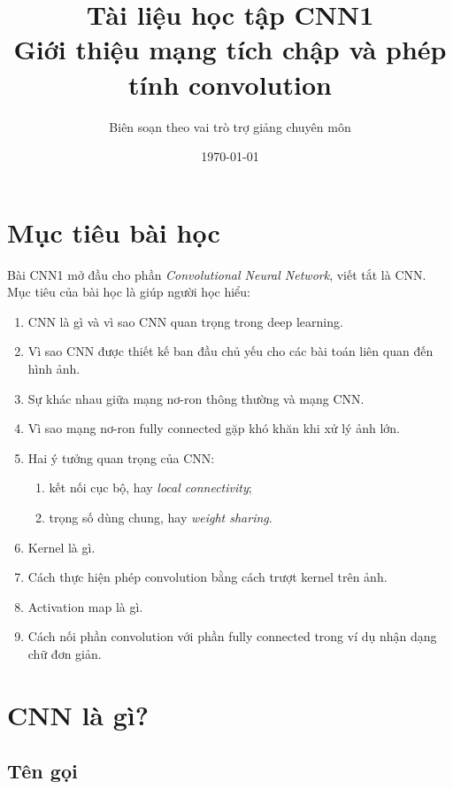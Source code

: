 \documentclass[12pt,a4paper]{report}
\title{
    \textbf{Tài liệu học tập CNN1}\\
    \large Giới thiệu mạng tích chập và phép tính convolution
}
\author{Biên soạn theo vai trò trợ giảng chuyên môn}
\date{\today}
\begin{document}
\maketitle
\tableofcontents
\newpage

\chapter*{Mục tiêu bài học}

Bài CNN1 mở đầu cho phần \textit{Convolutional Neural Network}, viết tắt là CNN. Mục tiêu của bài học là giúp người học hiểu:

\begin{enumerate}[label=\arabic*.]
    \item CNN là gì và vì sao CNN quan trọng trong deep learning.
    \item Vì sao CNN được thiết kế ban đầu chủ yếu cho các bài toán liên quan đến hình ảnh.
    \item Sự khác nhau giữa mạng nơ-ron thông thường và mạng CNN.
    \item Vì sao mạng nơ-ron fully connected gặp khó khăn khi xử lý ảnh lớn.
    \item Hai ý tưởng quan trọng của CNN:
    \begin{enumerate}
        \item kết nối cục bộ, hay \textit{local connectivity};
        \item trọng số dùng chung, hay \textit{weight sharing}.
    \end{enumerate}
    \item Kernel là gì.
    \item Cách thực hiện phép convolution bằng cách trượt kernel trên ảnh.
    \item Activation map là gì.
    \item Cách nối phần convolution với phần fully connected trong ví dụ nhận dạng chữ đơn giản.
\end{enumerate}

\chapter{CNN là gì?}

\section{Tên gọi}
\end{document}
